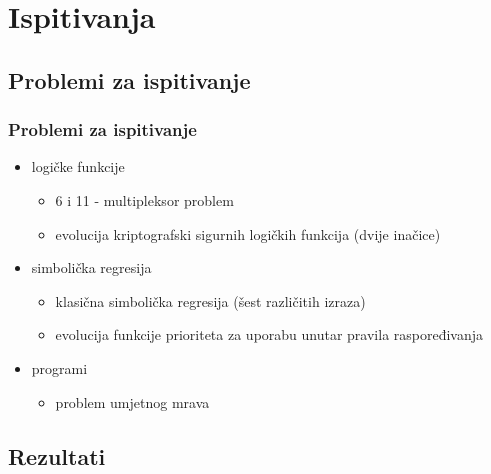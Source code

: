 \documentclass{beamer}
\begin{document}
\section{Ispitivanja}
\subsection{Problemi za ispitivanje}
\begin{frame}
\frametitle{Problemi za ispitivanje}
\begin{itemize}
\item{logičke funkcije
	\begin{itemize}
	\item{6 i 11 - multipleksor problem}
	\item{evolucija kriptografski sigurnih logičkih funkcija (dvije inačice)}
	\end{itemize}
}
\item{simbolička regresija
	\begin{itemize}
	\item{klasična simbolička regresija (šest različitih izraza)}
	\item{evolucija funkcije prioriteta za uporabu unutar pravila raspoređivanja}
	\end{itemize}
}
\item{programi
	\begin{itemize}
	\item{problem umjetnog mrava}
	\end{itemize}
}

\end{itemize}
\end{frame}


\subsection{Rezultati}
\end{document}
